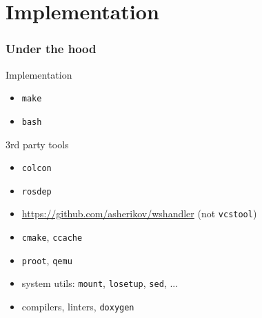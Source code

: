\documentclass[hyperref={colorlinks=false, breaklinks=true},11pt]{beamer}
\begin{document}
\section{Implementation}

\begin{frame}
    \frametitle{Under the hood}

    \begin{block}{Implementation}
        \begin{itemize}
            \item[] \texttt{make}
            \item[] \texttt{bash}
        \end{itemize}
    \end{block}

    \begin{block}{3rd party tools}
        \begin{itemize}
            \item[] \texttt{colcon}
            \item[] \texttt{rosdep}
            \item[] \url{https://github.com/asherikov/wshandler} (not \texttt{vcstool})
            \item[] \texttt{cmake}, \texttt{ccache}
            \item[] \texttt{proot}, \texttt{qemu}
            \item[] system utils: \texttt{mount}, \texttt{losetup}, \texttt{sed}, ...
            \item[] compilers, linters, \texttt{doxygen}
        \end{itemize}
    \end{block}
\end{frame}
\end{document}
